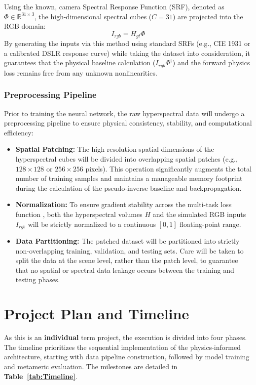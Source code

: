 \documentclass[stu]{apa7}
\begin{document}
Using the known, camera Spectral Response Function (SRF), denoted as $\Phi \in \mathbb{R}^{31 \times 3}$, the high-dimensional spectral cubes ($C=31$) are projected into the RGB domain:
$$I_{rgb} = H_{gt} \Phi$$
By generating the inputs via this method using standard SRFs (e.g., CIE 1931 or a calibrated DSLR response curve) while taking the dataset into consideration, it guarantees that the physical baseline calculation ($I_{rgb} \Phi^{\dagger}$) and the forward physics loss remains free from any unknown nonlinearities.

\subsubsection{Preprocessing Pipeline}
Prior to training the neural network, the raw hyperspectral data will undergo a preprocessing pipeline to ensure physical consistency, stability, and computational efficiency:

\begin{itemize}
    \item \textbf{Spatial Patching:} The high-resolution spatial dimensions of the hyperspectral cubes will be divided into overlapping spatial patches (e.g., $128 \times 128$ or $256 \times 256$ pixels). This operation significantly augments the total number of training samples and maintains a manageable memory footprint during the calculation of the pseudo-inverse baseline and backpropagation.
    \item \textbf{Normalization:} To ensure gradient stability across the multi-task loss function \parencite{chen2018gradnormgradientnormalizationadaptive}, both the hyperspectral volumes $H$ and the simulated RGB inputs $I_{rgb}$ will be strictly normalized to a continuous $[0, 1]$ floating-point range. 
    \item \textbf{Data Partitioning:} The patched dataset will be partitioned into strictly non-overlapping training, validation, and testing sets. Care will be taken to split the data at the scene level, rather than the patch level, to guarantee that no spatial or spectral data leakage occurs between the training and testing phases.
\end{itemize}

\section{Project Plan and Timeline}
As this is an \textbf{individual} term project, the execution is divided into four phases. The timeline prioritizes the sequential implementation of the physics-informed architecture, starting with data pipeline construction, followed by model training and metameric evaluation. The milestones are detailed in \textbf{Table~\ref{tab:Timeline}}.
\end{document}
